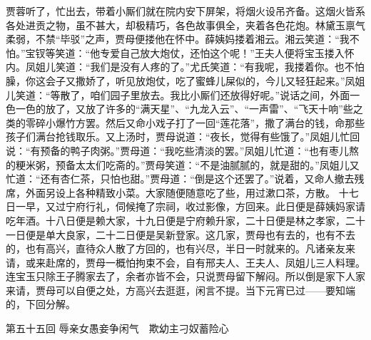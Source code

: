 \documentclass[12pt,oneside]{book}
\begin{document}
贾蓉听了，忙出去，带着小厮们就在院内安下屏架，将烟火设吊齐备。这烟火皆系各处进贡之物，虽不甚大，却极精巧，各色故事俱全，夹着各色花炮。林黛玉禀气柔弱，不禁“毕驳”之声，贾母便搂他在怀中。薛姨妈搂着湘云。湘云笑道：“我不怕。”宝钗等笑道：“他专爱自己放大炮仗，还怕这个呢！”王夫人便将宝玉搂入怀内。凤姐儿笑道：“我们是没有人疼的了。”尤氏笑道：“有我呢，我搂着你。也不怕臊，你这会子又撒娇了，听见放炮仗，吃了蜜蜂儿屎似的，今儿又轻狂起来。”凤姐儿笑道：“等散了，咱们园子里放去。我比小厮们还放得好呢。”说话之间，外面一色一色的放了，又放了许多的“满天星”、“九龙入云”、“一声雷”、“飞天十响”些之类的零碎小爆竹方罢。然后又命小戏子打了一回“莲花落”，撒了满台的钱，命那些孩子们满台抢钱取乐。又上汤时，贾母说道：“夜长，觉得有些饿了。”凤姐儿忙回说：“有预备的鸭子肉粥。”贾母道：“我吃些清淡的罢。”凤姐儿忙道：“也有枣儿熬的粳米粥，预备太太们吃斋的。”贾母笑道：“不是油腻腻的，就是甜的。”凤姐儿又忙道：“还有杏仁茶，只怕也甜。”贾母道：“倒是这个还罢了。”说着，又命人撤去残席，外面另设上各种精致小菜。大家随便随意吃了些，用过漱口茶，方散。
十七日一早，又过宁府行礼，伺候掩了宗祠，收过影像，方回来。此日便是薛姨妈家请吃年酒。十八日便是赖大家，十九日便是宁府赖升家，二十日便是林之孝家，二十一日便是单大良家，二十二日便是吴新登家。这几家，贾母也有去的，也有不去的，也有高兴，直待众人散了方回的，也有兴尽，半日一时就来的。凡诸亲友来请，或来赴席的，贾母一概怕拘束不会，自有邢夫人、王夫人、凤姐儿三人料理。连宝玉只除王子腾家去了，余者亦皆不会，只说贾母留下解闷。所以倒是家下人家来请，贾母可以自便之处，方高兴去逛逛，闲言不提。当下元宵已过——要知端的，下回分解。
















 
第五十五回  辱亲女愚妾争闲气　欺幼主刁奴蓄险心
\end{document}
